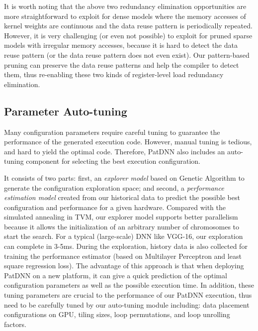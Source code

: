 \documentclass[sigplan,screen]{acmart}
\begin{document}
It is worth noting that the above two redundancy elimination opportunities are more straightforward to exploit for dense models where the memory accesses of kernel weights are continuous and the data reuse pattern is periodically repeated. However, it is very challenging (or even not possible) to exploit for pruned sparse models with irregular memory accesses, because it is hard to detect the data reuse pattern (or the data reuse pattern does not even exist). Our pattern-based pruning can preserve the data reuse patterns and help the compiler to detect them, thus re-enabling these two kinds of register-level load redundancy elimination.
%
 

\subsection{Parameter Auto-tuning}\label{sec:auto-tuning}



Many configuration parameters require careful tuning to guarantee the performance of the generated execution code. However, manual tuning is tedious, and hard to yield the optimal code.
Therefore, PatDNN also includes an auto-tuning component for selecting the best execution configuration.

It consists of two parts: first, an {\em explorer model} based on Genetic Algorithm to generate the configuration exploration space; and second, a {\em performance estimation model} created from our historical data to predict the possible best configuration and performance for a given hardware. 
Compared with the simulated annealing in TVM, our explorer model supports better parallelism because it allows the initialization of an arbitrary number of chromosomes to start the search.
For a typical (large-scale) DNN like VGG-16, our exploration can complete in 3-5ms. During the exploration, history data is also collected for training the performance estimator (based on Multilayer Perceptron and least square regression loss). The advantage of this approach is that when deploying PatDNN on a new platform, it can give a quick prediction of the optimal configuration parameters as well as the possible execution time.
In addition, these tuning parameters are crucial to the performance of our PatDNN execution, thus need
to be carefully tuned by our auto-tuning module
including: data placement configurations on GPU, tiling sizes, loop permutations, and loop unrolling factors. 
\end{document}
